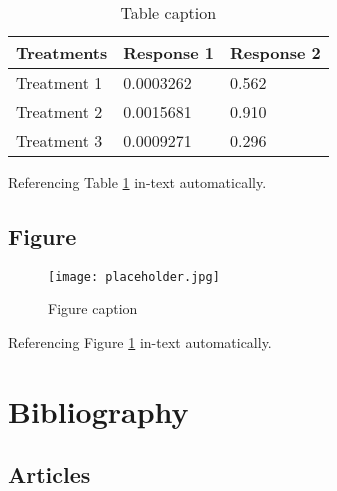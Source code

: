 \documentclass[11pt,fleqn]{book}
\begin{document}
\begin{table}[h]
\centering
\begin{tabular}{l l l}
\toprule
\textbf{Treatments} & \textbf{Response 1} & \textbf{Response 2}\\
\midrule
Treatment 1 & 0.0003262 & 0.562 \\
Treatment 2 & 0.0015681 & 0.910 \\
Treatment 3 & 0.0009271 & 0.296 \\
\bottomrule
\end{tabular}
\caption{Table caption}
\label{tab:example} %
\end{table}

Referencing Table \ref{tab:example} in-text automatically.


\section{Figure}

\begin{figure}[h]
\centering\texttt{[image: placeholder.jpg]}
\caption{Figure caption}
\label{fig:placeholder} %
\end{figure}

Referencing Figure \ref{fig:placeholder} in-text automatically.


\chapter*{Bibliography}


\section*{Articles}
\printbibliography[heading=bibempty,type=article]
\end{document}
